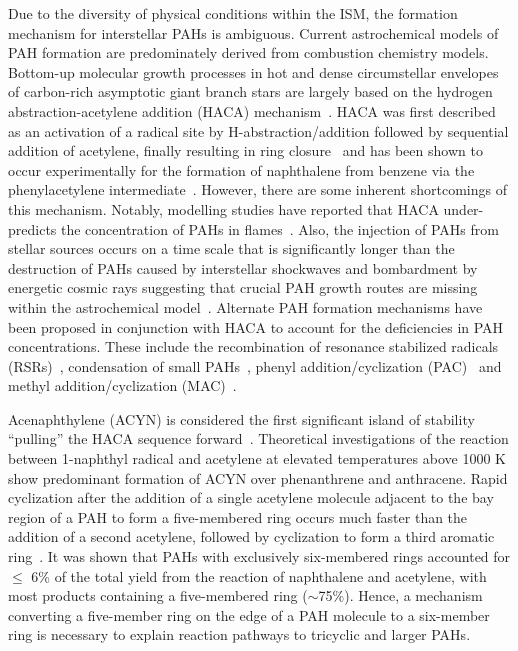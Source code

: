 \documentclass[journal=jacsat,manuscript=article,layout=onecolumn]{achemso}
\begin{document}
Due to the diversity of physical conditions within the ISM, the formation mechanism for interstellar PAHs is ambiguous. Current astrochemical models of PAH formation are predominately derived from combustion chemistry models. Bottom-up molecular growth processes in hot and dense circumstellar envelopes of carbon-rich asymptotic giant branch stars are largely based on the hydrogen abstraction-acetylene addition (HACA) mechanism~\cite{tie13}. HACA was first described as an activation of a radical site by H-abstraction/addition followed by sequential addition of acetylene, finally resulting in ring closure~\cite{fre85} and has been shown to occur experimentally for the formation of naphthalene from benzene via the phenylacetylene intermediate~\cite{par14,yan16}. However, there are some inherent shortcomings of this mechanism. Notably, modelling studies have reported that HACA under-predicts the concentration of PAHs in flames~\cite{raj12}. Also, the injection of PAHs from stellar sources occurs on a time scale that is significantly longer than the destruction of PAHs caused by interstellar shockwaves and bombardment by energetic cosmic rays suggesting that crucial PAH growth routes are missing within the astrochemical model~\cite{mic10a,mic10b,mic11}. Alternate PAH formation mechanisms have been proposed in conjunction with HACA to account for the deficiencies in PAH concentrations. These include the recombination of resonance stabilized radicals (RSRs)~\cite{mel96,mil92,joh18}, condensation of small PAHs~\cite{sie00}, phenyl addition/cyclization (PAC)~\cite{shu08} and methyl addition/cyclization (MAC)~\cite{shu10}.

Acenaphthylene (ACYN) is considered the first significant island of stability “pulling” the HACA sequence forward~\cite{fre20}. Theoretical investigations of the reaction between 1-naphthyl radical and acetylene at elevated temperatures above 1000 K show predominant formation of ACYN over phenanthrene and anthracene. Rapid cyclization after the addition of a single acetylene molecule adjacent to the bay region of a PAH to form a five-membered ring occurs much faster than the addition of a second acetylene, followed by cyclization to form a third aromatic ring~\cite{kis13}.  It was shown that PAHs with exclusively six-membered rings accounted for $\leq$ 6\% of the total yield from the reaction of naphthalene and acetylene, with most products containing a five-membered ring ($\sim$75\%). Hence, a mechanism converting a five-member ring on the edge of a PAH molecule to a six-member ring is necessary to explain reaction pathways to tricyclic and larger PAHs.
\end{document}

